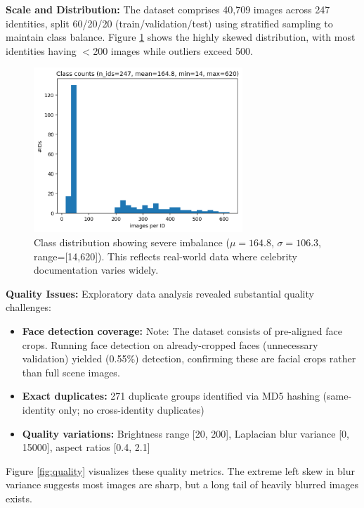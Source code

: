 \documentclass[11pt,a4paper]{article}
\begin{document}
\textbf{Scale and Distribution:} The dataset comprises 40,709 images across 247 identities, split 60/20/20 (train/validation/test) using stratified sampling to maintain class balance. Figure \ref{fig:class_counts} shows the highly skewed distribution, with most identities having $<$200 images while outliers exceed 500.

\begin{figure}[H]
    \centering
    \includegraphics[width=0.7\textwidth]{runs/eda/class_counts.png}
    \caption{Class distribution showing severe imbalance ($\mu=164.8$, $\sigma=106.3$, range=[14,620]). This reflects real-world data where celebrity documentation varies widely.}
    \label{fig:class_counts}
\end{figure}

\textbf{Quality Issues:} Exploratory data analysis revealed substantial quality challenges:
\begin{itemize}
    \item \textbf{Face detection coverage:} Note: The dataset consists of pre-aligned face crops. Running face detection on already-cropped faces (unnecessary validation) yielded (0.55\%) detection, confirming these are facial crops rather than full scene images.
    \item \textbf{Exact duplicates:} 271 duplicate groups identified via MD5 hashing (same-identity only; no cross-identity duplicates)
    \item \textbf{Quality variations:} Brightness range [20, 200], Laplacian blur variance [0, 15000], aspect ratios [0.4, 2.1]
\end{itemize}

Figure \ref{fig:quality} visualizes these quality metrics. The extreme left skew in blur variance suggests most images are sharp, but a long tail of heavily blurred images exists.
\end{document}
